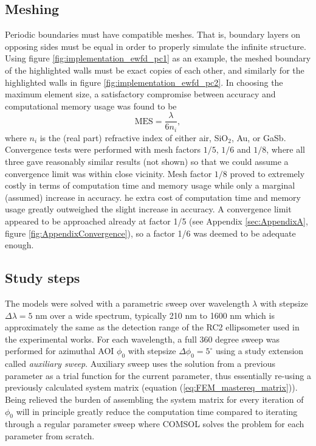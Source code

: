 \subsection{Meshing}
Periodic boundaries must have compatible meshes. That is, boundary layers on opposing sides must be equal in order to properly simulate the infinite structure. Using figure \ref{fig:implementation_ewfd_pc1} as an example, the meshed boundary of the highlighted walls must be exact copies of each other, and similarly for the highlighted walls in figure \ref{fig:implementation_ewfd_pc2}. In choosing the maximum element size, a satisfactory compromise between accuracy and computational memory usage was found to be 
\begin{equation}
    \text{MES} = \frac{\lambda}{6n_i},
    \label{eq:MES=lambda/6n}
\end{equation}
where $n_i$ is the (real part) refractive index of either air, SiO$_2$, Au, or GaSb. Convergence tests were performed with mesh factors $1/5$, $1/6$ and $1/8$, where all three gave reasonably similar results (not shown) so that we could assume a convergence limit was within close vicinity. Mesh factor $1/8$ proved to extremely costly in terms of computation time and memory usage while only a marginal (assumed) increase in accuracy. he extra cost of computation time and memory usage greatly outweighed the slight increase in accuracy. A convergence limit appeared to be approached already at factor 1/5 (see Appendix \ref{sec:AppendixA}, figure \ref{fig:AppendixConvergence}), so a factor 1/6 was deemed to be adequate enough.


\subsection{Study steps}
The models were solved with a parametric sweep over wavelength $\lambda$ with stepsize $\Delta\lambda=5$ nm over a wide spectrum, typically 210 nm to 1600 nm which is approximately the same as the detection range of the RC2 ellipsometer used in the experimental works. For each wavelength, a full 360 degree sweep was performed for azimuthal AOI $\phi_0$ with stepsize $\Delta\phi_0=5^{\circ}$ using a study extension called \emph{auxiliary sweep}. Auxiliary sweep uses the solution from a previous parameter as a trial function for the current parameter, thus essentially re-using a previously calculated system matrix (equation (\ref{eq:FEM_mastereq_matrix})). Being relieved the burden of assembling the system matrix for every iteration of $\phi_0$ will in principle greatly reduce the computation time compared to iterating through a regular parameter sweep where COMSOL solves the problem for each parameter from scratch. 

